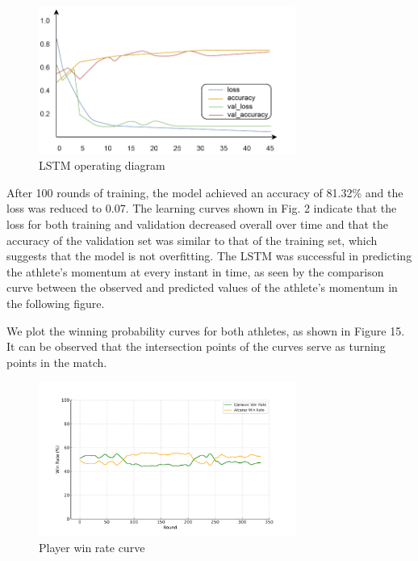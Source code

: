 \documentclass[12pt]{article}  %
\begin{document}
\begin{figure}[htbp]
    \centering
    \includegraphics[width=0.75\textwidth]{picture/lstm四线图.pdf} 	%
    \caption{LSTM operating diagram}		%
    \label{fig:sensitive_analysis1}							%
\end{figure}
\FloatBarrier
After 100 rounds of training, the model achieved an accuracy of 81.32\% and the loss was reduced to 0.07. The learning curves shown in Fig. 2 indicate that the loss for both training and validation decreased overall over time and that the accuracy of the validation set was similar to that of the training set, which suggests that the model is not overfitting. The LSTM was successful in predicting the athlete's momentum at every instant in time, as seen by the comparison curve between the observed and predicted values of the athlete's momentum in the following figure.

We plot the winning probability curves for both athletes, as shown in Figure 15. It can be observed that the intersection points of the curves serve as turning points in the match.

\begin{figure}[htbp]
    \centering
    \includegraphics[width=0.75\textwidth]{picture/win_rate_plot_no_title.pdf} 	%
    \caption{Player win rate curve}		%
    \label{fig:sensitive_analysis1}							%
\end{figure}
\FloatBarrier
\end{document}
